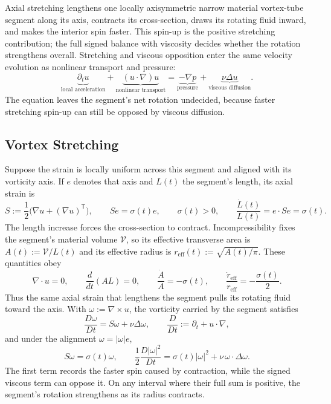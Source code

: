 
Axial stretching lengthens one locally axisymmetric narrow material vortex-tube segment along its axis, contracts its cross-section, draws its rotating fluid inward, and makes the interior spin faster. This spin-up is the positive stretching contribution; the full signed balance with viscosity decides whether the rotation strengthens overall. Stretching and viscous opposition enter the same velocity evolution as nonlinear transport and pressure:
\[
  \underbrace{\partial_t u}_{\text{local acceleration}}
  +
  \underbrace{(u\cdot\nabla)u}_{\text{nonlinear transport}}
  =
  \underbrace{-\nabla p}_{\text{pressure}}
  +
  \underbrace{\nu\Delta u}_{\text{viscous diffusion}}.
\]
The equation leaves the segment's net rotation undecided, because faster stretching spin-up can still be opposed by viscous diffusion.

\subsection{Vortex Stretching}\label{sub:ThePerfectlyStretchingVortex}

Suppose the strain is locally uniform across this segment and aligned with its vorticity axis. If \(e\) denotes that axis and \(L(t)\) the segment's length, its axial strain is
\[
  S:=\frac12\bigl(\nabla u+(\nabla u)^{\mathsf T}\bigr),
  \qquad
  Se=\sigma(t)e,
  \qquad
  \sigma(t)>0,
  \qquad
  \frac{\dot L(t)}{L(t)}
  =
  e\cdot Se
  =
  \sigma(t).
\]
The length increase forces the cross-section to contract. Incompressibility fixes the segment's material volume \(\mathcal V\), so its effective transverse area is \(A(t):=\mathcal V/L(t)\) and its effective radius is \(r_{\mathrm{eff}}(t):=\sqrt{A(t)/\pi}\). These quantities obey
\[
  \nabla\cdot u=0,
  \qquad
  \frac{d}{dt}(A L)=0,
  \qquad
  \frac{\dot A}{A}=-\sigma(t),
  \qquad
  \frac{\dot r_{\mathrm{eff}}}{r_{\mathrm{eff}}}
  =
  -\frac{\sigma(t)}{2}.
\]
Thus the same axial strain that lengthens the segment pulls its rotating fluid toward the axis. With \(\omega:=\nabla\times u\), the vorticity carried by the segment satisfies
\[
  \frac{D\omega}{Dt}
  =
  S\omega+\nu\Delta\omega,
  \qquad
  \frac{D}{Dt}
  :=
  \partial_t+u\cdot\nabla,
\]
and under the alignment \(\omega=|\omega|e\),
\[
  S\omega
  =
  \sigma(t)\omega,
  \qquad
  \frac12\frac{D|\omega|^2}{Dt}
  =
  \sigma(t)|\omega|^2
  +
  \nu\,\omega\cdot\Delta\omega.
\]
The first term records the faster spin caused by contraction, while the signed viscous term can oppose it. On any interval where their full sum is positive, the segment's rotation strengthens as its radius contracts.

